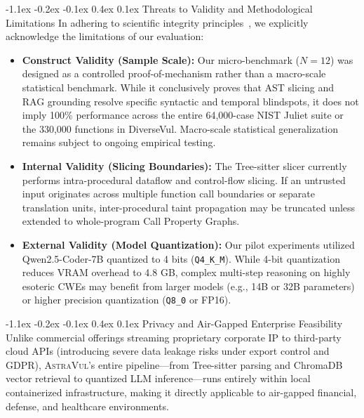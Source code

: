 \documentclass[10pt,twocolumn]{article}
\makeatletter
\renewcommand\subsection{\@startsection{subsection}{2}{\z@}%
  {-1.1ex \@plus -0.2ex \@minus -0.1ex}%
  {0.4ex \@plus 0.1ex}%
  {\normalfont\normalsize\bfseries}}
\makeatother
\begin{document}
\subsection{Threats to Validity and Methodological Limitations}
In adhering to scientific integrity principles~\cite{arp2026chasingshadows}, we explicitly acknowledge the limitations of our evaluation:
\begin{itemize}[leftmargin=9pt,topsep=1pt,itemsep=0.5pt]
    \item \textbf{Construct Validity (Sample Scale):} Our micro-benchmark ($N=12$) was designed as a controlled proof-of-mechanism rather than a macro-scale statistical benchmark. While it conclusively proves that AST slicing and RAG grounding resolve specific syntactic and temporal blindspots, it does not imply 100\% performance across the entire 64,000-case NIST Juliet suite or the 330,000 functions in DiverseVul. Macro-scale statistical generalization remains subject to ongoing empirical testing.
    \item \textbf{Internal Validity (Slicing Boundaries):} The Tree-sitter slicer currently performs intra-procedural dataflow and control-flow slicing. If an untrusted input originates across multiple function call boundaries or separate translation units, inter-procedural taint propagation may be truncated unless extended to whole-program Call Property Graphs.
    \item \textbf{External Validity (Model Quantization):} Our pilot experiments utilized Qwen2.5-Coder-7B quantized to 4 bits (\texttt{Q4\_K\_M}). While 4-bit quantization reduces VRAM overhead to 4.8 GB, complex multi-step reasoning on highly esoteric CWEs may benefit from larger models (e.g., 14B or 32B parameters) or higher precision quantization (\texttt{Q8\_0} or FP16).
\end{itemize}

\subsection{Privacy and Air-Gapped Enterprise Feasibility}
Unlike commercial offerings streaming proprietary corporate IP to third-party cloud APIs (introducing severe data leakage risks under export control and GDPR), \textsc{AstraVul}'s entire pipeline—from Tree-sitter parsing and ChromaDB vector retrieval to quantized LLM inference—runs entirely within local containerized infrastructure, making it directly applicable to air-gapped financial, defense, and healthcare environments.
\end{document}
